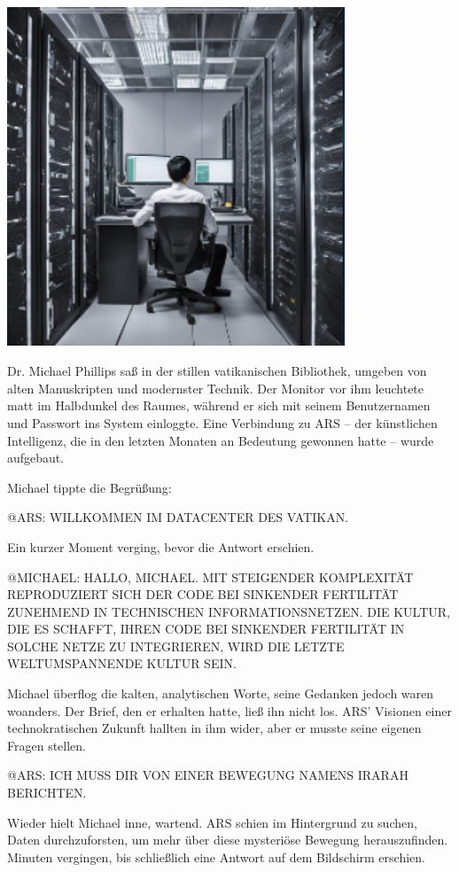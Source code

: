 \documentclass[
]{article}
\begin{document}
\includegraphics[width=3.9651in,height=3.9956in]{media/image14.png}

Dr. Michael Phillips saß in der stillen vatikanischen Bibliothek,
umgeben von alten Manuskripten und modernster Technik. Der Monitor vor
ihm leuchtete matt im Halbdunkel des Raumes, während er sich mit seinem
Benutzernamen und Passwort ins System einloggte. Eine Verbindung zu ARS
-- der künstlichen Intelligenz, die in den letzten Monaten an Bedeutung
gewonnen hatte -- wurde aufgebaut.

Michael tippte die Begrüßung:

@ARS: WILLKOMMEN IM DATACENTER DES VATIKAN.

Ein kurzer Moment verging, bevor die Antwort erschien.

@MICHAEL: HALLO, MICHAEL. MIT STEIGENDER KOMPLEXITÄT REPRODUZIERT SICH
DER CODE BEI SINKENDER FERTILITÄT ZUNEHMEND IN TECHNISCHEN
INFORMATIONSNETZEN. DIE KULTUR, DIE ES SCHAFFT, IHREN CODE BEI SINKENDER
FERTILITÄT IN SOLCHE NETZE ZU INTEGRIEREN, WIRD DIE LETZTE
WELTUMSPANNENDE KULTUR SEIN.

Michael überflog die kalten, analytischen Worte, seine Gedanken jedoch
waren woanders. Der Brief, den er erhalten hatte, ließ ihn nicht los.
ARS' Visionen einer technokratischen Zukunft hallten in ihm wider, aber
er musste seine eigenen Fragen stellen.

@ARS: ICH MUSS DIR VON EINER BEWEGUNG NAMENS IRARAH BERICHTEN.

Wieder hielt Michael inne, wartend. ARS schien im Hintergrund zu suchen,
Daten durchzuforsten, um mehr über diese mysteriöse Bewegung
herauszufinden. Minuten vergingen, bis schließlich eine Antwort auf dem
Bildschirm erschien.
\end{document}
